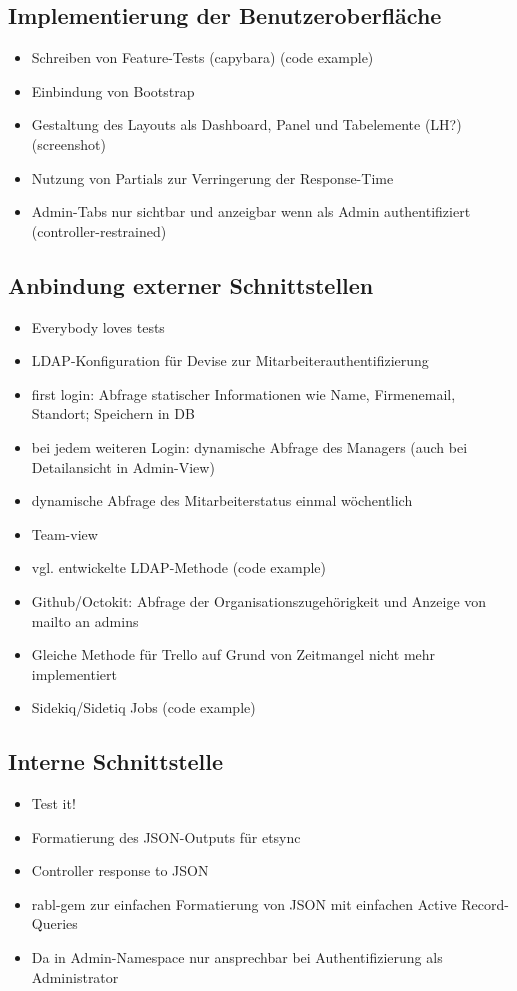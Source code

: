 \subsection{Implementierung der Benutzeroberfläche}
\label{sec:Implementierung der Benutzeroberfläche}
\begin{itemize}
	\item Schreiben von Feature-Tests (capybara) (code example)
	\item Einbindung von Bootstrap
	\item Gestaltung des Layouts als Dashboard, Panel und Tabelemente (LH?) (screenshot)
	\item Nutzung von Partials zur Verringerung der Response-Time
	\item Admin-Tabs nur sichtbar und anzeigbar wenn als Admin authentifiziert (controller-restrained)
\end{itemize}

\subsection{Anbindung externer Schnittstellen}
\label{sec:Anbindung externer Schnittstellen}
\begin{itemize}
	\item Everybody loves tests
	\item LDAP-Konfiguration für Devise zur Mitarbeiterauthentifizierung
	\item first login: Abfrage statischer Informationen wie Name, Firmenemail, Standort; Speichern in DB
	\item bei jedem weiteren Login: dynamische Abfrage des Managers (auch bei Detailansicht in Admin-View)
	\item dynamische Abfrage des Mitarbeiterstatus einmal wöchentlich
	\item Team-view
	\item vgl. entwickelte LDAP-Methode (code example)
	\item Github/Octokit: Abfrage der Organisationszugehörigkeit und Anzeige von mailto an admins
	\item Gleiche Methode für Trello auf Grund von Zeitmangel nicht mehr implementiert
	\item Sidekiq/Sidetiq Jobs (code example)
\end{itemize}

\subsection{Interne Schnittstelle}
\label{sec:Interne Schnittstelle}
\begin{itemize}
	\item Test it!
	\item Formatierung des JSON-Outputs für etsync
	\item Controller response to JSON
	\item rabl-gem zur einfachen Formatierung von JSON mit einfachen Active Record-Queries
	\item Da in Admin-Namespace nur ansprechbar bei Authentifizierung als Administrator
\end{itemize}

